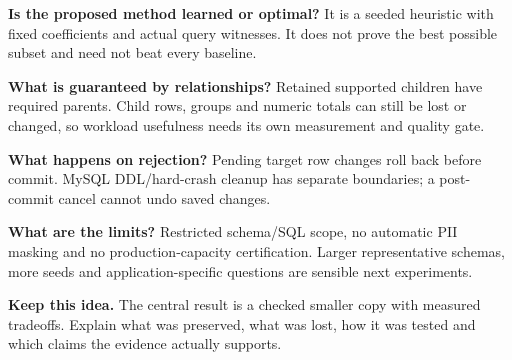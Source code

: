 \documentclass[11pt,a4paper]{article}
\newcommand{\remember}[1]{\par\begingroup\setlength{\fboxsep}{8pt}\colorbox{wash}{\parbox{\dimexpr\linewidth-16pt\relax}{\textbf{Keep this idea.} #1}}\endgroup\par}
\begin{document}
\textbf{Is the proposed method learned or optimal?} It is a seeded heuristic with fixed coefficients and actual query witnesses. It does not prove the best possible subset and need not beat every baseline.

\textbf{What is guaranteed by relationships?} Retained supported children have required parents. Child rows, groups and numeric totals can still be lost or changed, so workload usefulness needs its own measurement and quality gate.

\textbf{What happens on rejection?} Pending target row changes roll back before commit. MySQL DDL/hard-crash cleanup has separate boundaries; a post-commit cancel cannot undo saved changes.

\textbf{What are the limits?} Restricted schema/SQL scope, no automatic PII masking and no production-capacity certification. Larger representative schemas, more seeds and application-specific questions are sensible next experiments.

\remember{The central result is a checked smaller copy with measured tradeoffs. Explain what was preserved, what was lost, how it was tested and which claims the evidence actually supports.}
\end{document}
